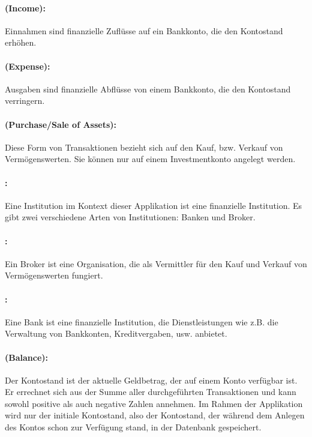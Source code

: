 \paragraph*{ (Income):} Einnahmen sind finanzielle Zuflüsse auf ein Bankkonto, die den Kontostand erhöhen.

\paragraph*{ (Expense):} Ausgaben sind finanzielle Abflüsse von einem Bankkonto, die den Kontostand verringern.

\paragraph*{ (Purchase/Sale of Assets):} Diese Form von Transaktionen bezieht sich auf den Kauf, bzw. Verkauf von Vermögenswerten. Sie können nur auf einem Investmentkonto angelegt werden.

\paragraph*{:} Eine Institution im Kontext dieser Applikation ist eine finanzielle Institution. Es gibt zwei verschiedene Arten von Institutionen: Banken und Broker.

\paragraph*{:} Ein Broker ist eine Organisation, die als Vermittler für den Kauf und Verkauf von Vermögenswerten fungiert.

\paragraph*{:} Eine Bank ist eine finanzielle Institution, die Dienstleistungen wie z.B. die Verwaltung von Bankkonten, Kreditvergaben, usw. anbietet.

\paragraph*{ (Balance):} Der Kontostand ist der aktuelle Geldbetrag, der auf einem Konto verfügbar ist. Er errechnet sich aus der Summe aller durchgeführten Transaktionen und kann sowohl positive als auch negative Zahlen annehmen. Im Rahmen der Applikation wird nur der initiale Kontostand, also der Kontostand, der während dem Anlegen des Kontos schon zur Verfügung stand, in der Datenbank gespeichert.

